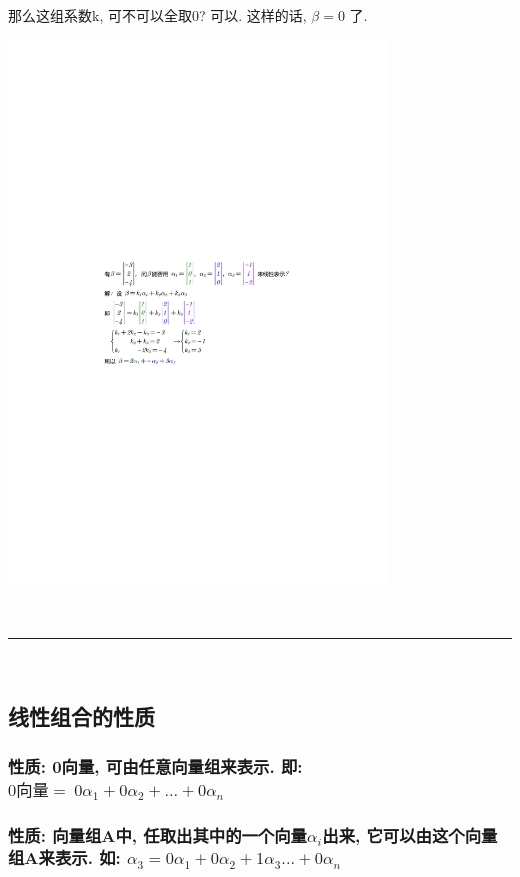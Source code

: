\documentclass[UTF8]{ctexart}
\begin{document}
那么这组系数k, 可不可以全取0? 可以. 这样的话,  $\beta=0$ 了. \\


\begin{myEnvSample}
	\includegraphics[width=0.75\textwidth]{img/0101.pdf}
\end{myEnvSample}



~\\
\hrule
~\\

\subsection{线性组合的性质}

\subsubsection{性质: 0向量, 可由任意向量组来表示. 即: $0\text{向量}=\ 0\alpha _1+0\alpha _2+...+0\alpha _n$}


\subsubsection{性质: 向量组A中, 任取出其中的一个向量$α_i$出来, 它可以由这个向量组A来表示. 如: $\alpha _3=0\alpha _1+0\alpha _2+1\alpha _3...+0\alpha _n$}
\end{document}
